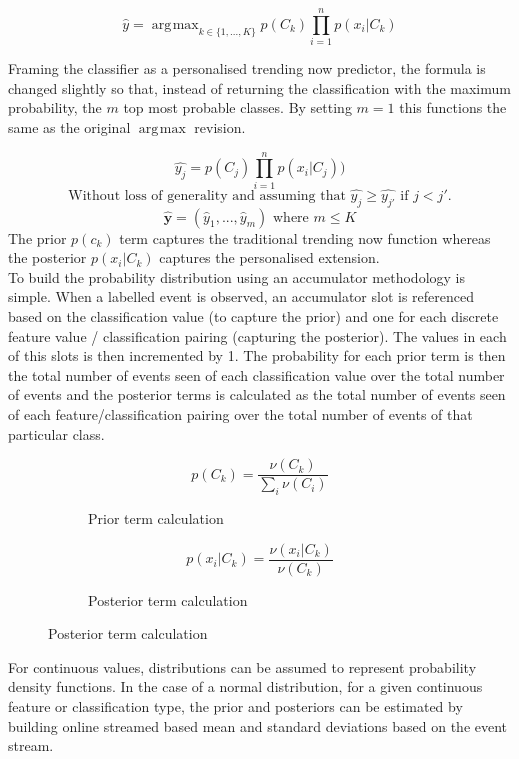 \documentclass[a4paper,11pt]{scrreprt}
\DeclareMathOperator*{\argmax}{\arg\!\max}
\begin{document}
\[\hat{y}=\argmax_{k \in \{1,...,K\}} p(C_k)\prod_{i=1}^n p(x_i | C_k)\]

Framing the classifier as a personalised trending now predictor, the formula is changed slightly so that, instead of returning the classification with the maximum probability, the \(m\) top most probable classes. By setting \(m=1\) this functions the same as the original \(\argmax\) revision. 

\[\hat{y_j}= p(C_j)\prod_{i=1}^n p(x_i | C_j))\]
\[\text{Without loss of generality and assuming that }  \hat{y_j} \geq \hat{y_{j'}} \text{ if } j < j'.\]
\[\mathbf{\hat{y}} = (\hat{y}_1, ..., \hat{y}_m) \text{ where } m \leq K\]
The prior \(p(c_k)\) term captures the traditional trending now function whereas the posterior \(p(x_i | C_k)\) captures the personalised extension.\\
To build the probability distribution using an accumulator methodology is simple. When a labelled event is observed, an accumulator slot is referenced based on the classification value (to capture the prior) and one for each discrete feature value / classification pairing (capturing the posterior). The values in each of this slots is then incremented by 1. The probability for each prior term is then the total number of events seen of each classification value over the total number of events and the posterior terms is calculated as the total number of events seen of each feature/classification pairing over the total number of events of that particular class.

\begin{figure}[h!]
\begin{subfigure}[t]{2 in}
\[p(C_k) = \frac{\nu(C_k)}{\sum_{i} \nu(C_i)}\]
\caption{Prior term calculation}
\end{subfigure}
\begin{subfigure}[t]{2 in}
\[p(x_i | C_k) = \frac{\nu(x_i | C_k)}{\nu(C_k)}\]
\caption{Posterior term calculation}
\end{subfigure}
\end{figure}
For continuous values, distributions can be assumed to represent probability density functions. In the case of a normal distribution, for a given continuous feature or classification type, the prior and posteriors can be estimated by building online streamed based mean and standard deviations based on the event stream. 
\end{document}
